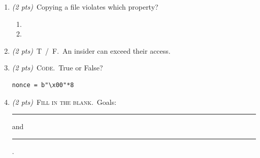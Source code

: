 \documentclass{article}
\newif\ifanswers\answersfalse
\begin{document}
\begin{enumerate}

\item \textit{(2 pts)}~Copying a file violates which property?
  \begin{enumerate}[label=(\alph*)]
    \item {}
    \item {}
  \end{enumerate}
  \ifanswers \textcolor{keyred}{\textbf{Answer:} a} \fi

\item \textit{(2 pts)}~\textsc{T~/~F.}~An insider can exceed their access.
  \ifanswers \textcolor{keyred}{\textbf{Answer:} True} \fi

\item \textit{(2 pts)}~\textsc{Code.}~True or False?
\begin{lstlisting}
nonce = b"\x00"*8
\end{lstlisting}
  \ifanswers \textcolor{keyred}{\textbf{Answer:} False --- reused nonce} \fi

\item \textit{(2 pts)}~\textsc{Fill in the blank.}~Goals: \rule[-2pt]{3cm}{0.4pt} and \rule[-2pt]{3cm}{0.4pt}.
  \ifanswers \textcolor{keyred}{\textbf{Answer:} confusion; diffusion} \fi

\end{enumerate}
\end{document}
